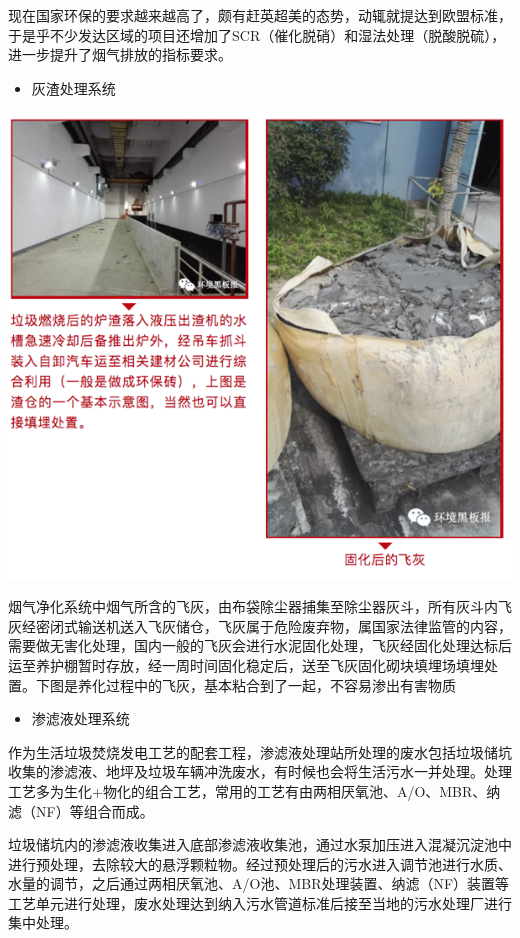 \documentclass[
]{book}
\providecommand{\tightlist}{%
  \setlength{\itemsep}{0pt}\setlength{\parskip}{0pt}}
\begin{document}
现在国家环保的要求越来越高了，颇有赶英超美的态势，动辄就提达到欧盟标准，于是乎不少发达区域的项目还增加了SCR（催化脱硝）和湿法处理（脱酸脱硫），进一步提升了烟气排放的指标要求。

\begin{itemize}
\tightlist
\item
  灰渣处理系统
\end{itemize}

\includegraphics[width=8.33in]{images/ljfs8}

烟气净化系统中烟气所含的飞灰，由布袋除尘器捕集至除尘器灰斗，所有灰斗内飞灰经密闭式输送机送入飞灰储仓，飞灰属于危险废弃物，属国家法律监管的内容，需要做无害化处理，国内一般的飞灰会进行水泥固化处理，飞灰经固化处理达标后运至养护棚暂时存放，经一周时间固化稳定后，送至飞灰固化砌块填埋场填埋处置。下图是养化过程中的飞灰，基本粘合到了一起，不容易渗出有害物质

\begin{itemize}
\tightlist
\item
  渗滤液处理系统
\end{itemize}

作为生活垃圾焚烧发电工艺的配套工程，渗滤液处理站所处理的废水包括垃圾储坑收集的渗滤液、地坪及垃圾车辆冲洗废水，有时候也会将生活污水一并处理。处理工艺多为生化+物化的组合工艺，常用的工艺有由两相厌氧池、A/O、MBR、纳滤（NF）等组合而成。

垃圾储坑内的渗滤液收集进入底部渗滤液收集池，通过水泵加压进入混凝沉淀池中进行预处理，去除较大的悬浮颗粒物。经过预处理后的污水进入调节池进行水质、水量的调节，之后通过两相厌氧池、A/O池、MBR处理装置、纳滤（NF）装置等工艺单元进行处理，废水处理达到纳入污水管道标准后接至当地的污水处理厂进行集中处理。
\end{document}
